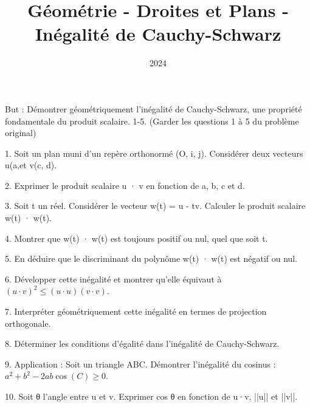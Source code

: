 \documentclass[10pt,a4paper]{article}
\title{Géométrie - Droites et Plans - Inégalité de Cauchy-Schwarz}
\author{}
\date{2024}
\begin{document}
\maketitle

But : Démontrer géométriquement l'inégalité de Cauchy-Schwarz, une propriété fondamentale du produit scalaire. 1-5. (Garder les questions 1 à 5 du problème original)

1. Soit un plan muni d'un repère orthonormé (O, i, j). Considérer deux vecteurs u(a,\ql et v(c, d).

2. Exprimer le produit scalaire u · v en fonction de a, b, c et d.

3. Soit t un réel. Considérer le vecteur w(t) = u - tv. Calculer le produit scalaire w(t) · w(t).

4. Montrer que w(t) · w(t) est toujours positif ou nul, quel que soit t.

5. En déduire que le discriminant du polynôme w(t) · w(t) est négatif ou nul.

6. Développer cette inégalité et montrer qu'elle équivaut à $(u \cdot v)^2 \leq (u \cdot u)(v \cdot v)$.

7. Interpréter géométriquement cette inégalité en termes de projection orthogonale.

8. Déterminer les conditions d'égalité dans l'inégalité de Cauchy-Schwarz.

9. Application : Soit un triangle ABC. Démontrer l'inégalité du cosinus : $a^2 + b^2 - 2ab \cos(C) \geq 0$.

10. Soit θ l'angle entre u et v. Exprimer cos θ en fonction de u·v, ||u|| et ||v||.
\end{document}

